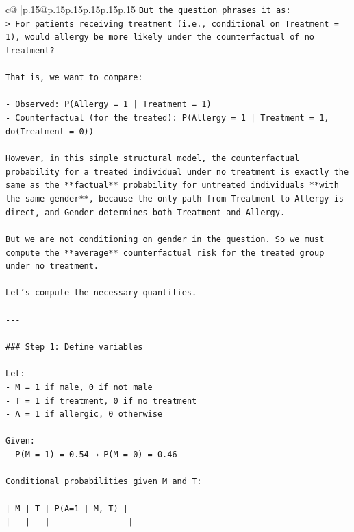 \documentclass{article}
\begin{document}
{\begin{supertabular}{c@{$\;$}|p{.15\linewidth}@{}p{.15\linewidth}p{.15\linewidth}p{.15\linewidth}p{.15\linewidth}p{.15\linewidth}}
{{{\texttt{But the question phrases it as:  } \\
\texttt{> For patients receiving treatment (i.e., conditional on Treatment = 1), would allergy be more likely under the counterfactual of no treatment?} \\
\\ 
\texttt{That is, we want to compare:} \\
\\ 
\texttt{{-} Observed: P(Allergy = 1 | Treatment = 1)  } \\
\texttt{{-} Counterfactual (for the treated): P(Allergy = 1 | Treatment = 1, do(Treatment = 0))} \\
\\ 
\texttt{However, in this simple structural model, the counterfactual probability for a treated individual under no treatment is exactly the same as the **factual** probability for untreated individuals **with the same gender**, because the only path from Treatment to Allergy is direct, and Gender determines both Treatment and Allergy.} \\
\\ 
\texttt{But we are not conditioning on gender in the question. So we must compute the **average** counterfactual risk for the treated group under no treatment.} \\
\\ 
\texttt{Let’s compute the necessary quantities.} \\
\\ 
\texttt{{-}{-}{-}} \\
\\ 
\texttt{\#\#\# Step 1: Define variables} \\
\\ 
\texttt{Let:} \\
\texttt{{-} M = 1 if male, 0 if not male} \\
\texttt{{-} T = 1 if treatment, 0 if no treatment} \\
\texttt{{-} A = 1 if allergic, 0 otherwise} \\
\\ 
\texttt{Given:} \\
\texttt{{-} P(M = 1) = 0.54 → P(M = 0) = 0.46} \\
\\ 
\texttt{Conditional probabilities given M and T:} \\
\\ 
\texttt{| M | T | P(A=1 | M, T) |} \\
\texttt{|{-}{-}{-}|{-}{-}{-}|{-}{-}{-}{-}{-}{-}{-}{-}{-}{-}{-}{-}{-}{-}{-}{-}|} \\
}}}
\end{supertabular}}
\end{document}
